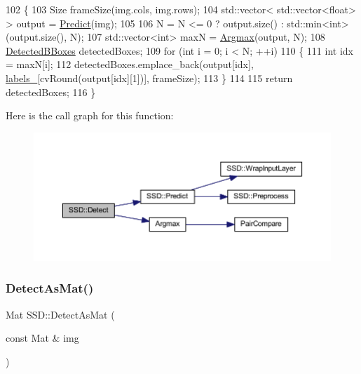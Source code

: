 \begin{DoxyCode}
102 \{
103     Size frameSize(img.cols, img.rows);
104     std::vector< std::vector<float> > output = \mbox{\hyperlink{class_s_s_d_a58c0ef81b4b24424fd967d90da5c6045}{Predict}}(img);
105 
106     N = N <= 0 ? output.size() : std::min<int>(output.size(), N);
107     std::vector<int> maxN = \mbox{\hyperlink{_s_s_d_8cpp_a9ad3e3d3a4acacc7312fe108b8de242a}{Argmax}}(output, N);
108     \mbox{\hyperlink{_s_s_d_8h_a6145f2543054bcfbafc56318060f727b}{DetectedBBoxes}} detectedBoxes;
109     \textcolor{keywordflow}{for} (\textcolor{keywordtype}{int} i = 0; i < N; ++i)
110     \{
111         \textcolor{keywordtype}{int} idx = maxN[i];
112         detectedBoxes.emplace\_back(output[idx], \mbox{\hyperlink{class_s_s_d_a1c4d34f2dda5d4ca2dfabbebff7a0ddb}{labels\_}}[cvRound(output[idx][1])], frameSize);
113     \}
114 
115     \textcolor{keywordflow}{return} detectedBoxes;
116 \}
\end{DoxyCode}
Here is the call graph for this function\+:\nopagebreak
\begin{figure}[H]
\begin{center}
\leavevmode
\includegraphics[width=350pt]{class_s_s_d_a35235278ff6d18ee494b2ccce3303c67_cgraph}
\end{center}
\end{figure}
\mbox{\label{class_s_s_d_a68c76ba1ebc94d222c1fd624db060f62}} 
\subsubsection{\texorpdfstring{Detect\+As\+Mat()}{DetectAsMat()}}
{\footnotesize\ttfamily Mat S\+S\+D\+::\+Detect\+As\+Mat (\begin{DoxyParamCaption}\item[{const Mat \&}]{img }\end{DoxyParamCaption})\hspace{0.3cm}{\ttfamily [virtual]}}



